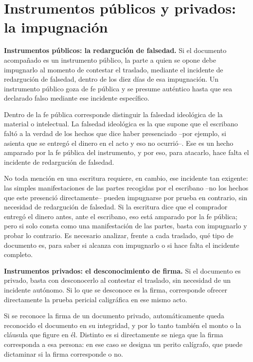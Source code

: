 \documentclass[12pt,oneside]{book}
\begin{document}
\section{Instrumentos públicos y privados: la impugnación}

\begin{important}
\textbf{Instrumentos públicos: la redargución de falsedad.} Si el documento acompañado es un instrumento público, la parte a quien se opone debe impugnarlo al momento de contestar el traslado, mediante el incidente de redargución de falsedad, dentro de los diez días de esa impugnación. Un instrumento público goza de fe pública y se presume auténtico hasta que sea declarado falso mediante ese incidente específico.
\end{important}

Dentro de la fe pública corresponde distinguir la falsedad ideológica de la material o intelectual. La falsedad ideológica es la que supone que el escribano faltó a la verdad de los hechos que dice haber presenciado --por ejemplo, si asienta que se entregó el dinero en el acto y eso no ocurrió--. Ese es un hecho amparado por la fe pública del instrumento, y por eso, para atacarlo, hace falta el incidente de redargución de falsedad.

No toda mención en una escritura requiere, en cambio, ese incidente tan exigente: las simples manifestaciones de las partes recogidas por el escribano --no los hechos que este presenció directamente-- pueden impugnarse por prueba en contrario, sin necesidad de redargución de falsedad. Si la escritura dice que el comprador entregó el dinero antes, ante el escribano, eso está amparado por la fe pública; pero si solo consta como una manifestación de las partes, basta con impugnarlo y probar lo contrario. Es necesario analizar, frente a cada traslado, qué tipo de documento es, para saber si alcanza con impugnarlo o si hace falta el incidente completo.

\begin{important}
\textbf{Instrumentos privados: el desconocimiento de firma.} Si el documento es privado, basta con desconocerlo al contestar el traslado, sin necesidad de un incidente autónomo. Si lo que se desconoce es la firma, corresponde ofrecer directamente la prueba pericial caligráfica en ese mismo acto.
\end{important}

\begin{note}
Si se reconoce la firma de un documento privado, automáticamente queda reconocido el documento en su integridad, y por lo tanto también el monto o la cláusula que figure en él. Distinto es si directamente se niega que la firma corresponda a esa persona: en ese caso se designa un perito calígrafo, que puede dictaminar si la firma corresponde o no.
\end{note}
\end{document}
